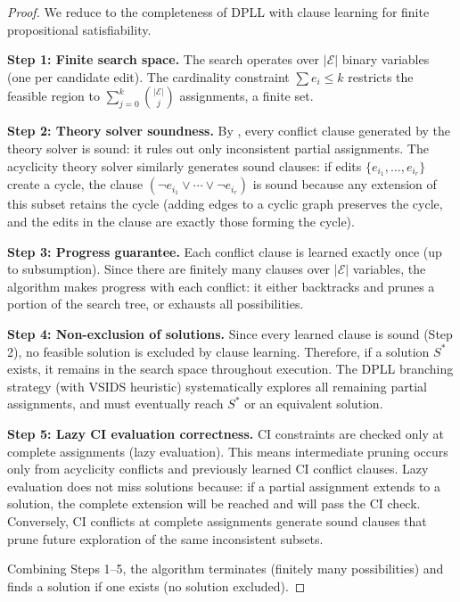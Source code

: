\documentclass[11pt,a4paper]{article}
\theoremstyle{definition}
\theoremstyle{remark}
\begin{document}
\begin{proof}
We reduce to the completeness of DPLL with clause learning for finite
propositional satisfiability.

\textbf{Step 1: Finite search space.}
The search operates over $|\mathcal{E}|$ binary variables (one per candidate
edit). The cardinality constraint $\sum e_i \leq k$ restricts the feasible
region to $\sum_{j=0}^{k} \binom{|\mathcal{E}|}{j}$ assignments, a finite set.

\textbf{Step 2: Theory solver soundness.}
By , every conflict clause generated by the theory
solver is sound: it rules out only inconsistent partial assignments.
The acyclicity theory solver similarly generates sound clauses: if edits
$\{e_{i_1}, \ldots, e_{i_r}\}$ create a cycle, the clause
$(\neg e_{i_1} \vee \cdots \vee \neg e_{i_r})$ is sound because any
extension of this subset retains the cycle (adding edges to a cyclic
graph preserves the cycle, and the edits in the clause are exactly those
forming the cycle).

\textbf{Step 3: Progress guarantee.}
Each conflict clause is learned exactly once (up to subsumption). Since
there are finitely many clauses over $|\mathcal{E}|$ variables, the
algorithm makes progress with each conflict: it either backtracks and
prunes a portion of the search tree, or exhausts all possibilities.

\textbf{Step 4: Non-exclusion of solutions.}
Since every learned clause is sound (Step 2), no feasible solution is
excluded by clause learning. Therefore, if a solution $S^*$ exists, it
remains in the search space throughout execution. The DPLL branching
strategy (with VSIDS heuristic) systematically explores all remaining
partial assignments, and must eventually reach $S^*$ or an equivalent
solution.

\textbf{Step 5: Lazy CI evaluation correctness.}
CI constraints are checked only at complete assignments (lazy evaluation).
This means intermediate pruning occurs only from acyclicity conflicts and
previously learned CI conflict clauses. Lazy evaluation does not miss
solutions because: if a partial assignment extends to a solution, the
complete extension will be reached and will pass the CI check. Conversely,
CI conflicts at complete assignments generate sound clauses that prune
future exploration of the same inconsistent subsets.

Combining Steps 1--5, the algorithm terminates (finitely many
possibilities) and finds a solution if one exists (no solution excluded).
\end{proof}
\end{document}

